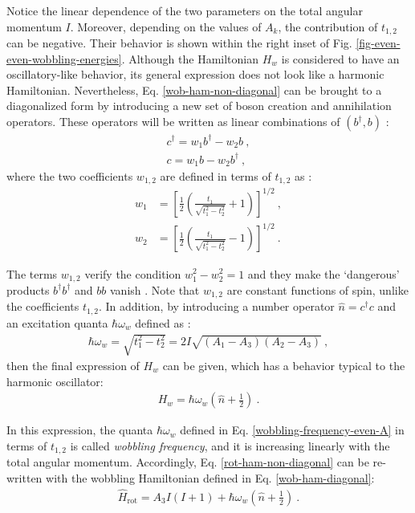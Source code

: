 Notice the linear dependence of the two parameters on the total angular momentum $I$. Moreover, depending on the values of $A_k$, the contribution of $t_{1,2}$ can be negative. Their behavior is shown within the right inset of Fig. \ref{fig-even-even-wobbling-energies}. Although the Hamiltonian $H_w$ is considered to have an oscillatory-like behavior, its general expression does not look like a harmonic Hamiltonian. Nevertheless, Eq. \ref{wob-ham-non-diagonal} can be brought to a diagonalized form by introducing a new set of boson creation and annihilation operators. These operators will be written as linear combinations of $(b^\dagger,b)$ \cite{bohr1998nuclear}:
\begin{align}
    c^\dagger=w_1b^\dagger-w_2b\ ,\\
    c=w_1b-w_2b^\dagger\ ,
\end{align}
where the two coefficients $w_{1,2}$ are defined in terms of $t_{1,2}$ as \cite{bohr1998nuclear}:
\begin{align}
    w_1&=\left[\frac{1}{2}\left(\frac{t_1}{\sqrt{t_1^2-t_2^2}}+1\right)\right]^{1/2}\ ,\nonumber\\
    w_2&=\left[\frac{1}{2}\left(\frac{t_1}{\sqrt{t_1^2-t_2^2}}-1\right)\right]^{1/2}\ .
    \label{eqs-w1-w2-terms-wobbling}
\end{align}

The terms $w_{1,2}$ verify the condition $w_1^2-w_2^2=1$ and they make the `dangerous' products $b^\dagger b^\dagger$ and $bb$ vanish \cite{oi2006semi}. Note that $w_{1,2}$ are constant functions of spin, unlike the coefficients $t_{1,2}$. In addition, by introducing a number operator $\hat{n}=c^\dagger c$ and an excitation quanta $\hbar\omega_w$ defined as \cite{bohr1998nuclear}:
\begin{align}
    \hbar\omega_w=\sqrt{t_1^2-t_2^2}=2I\sqrt{(A_1-A_3)(A_2-A_3)}\ ,
    \label{wobbling-frequency-even-A}
\end{align}
then the final expression of $H_w$ can be given, which has a behavior typical to the harmonic oscillator:
\begin{align}
    H_w=\hbar\omega_w\left(\hat{n}+\frac{1}{2}\right)\ .
    \label{wob-ham-diagonal}
\end{align}

In this expression, the quanta $\hbar\omega_w$ defined in Eq. \ref{wobbling-frequency-even-A} in terms of $t_{1,2}$ is called \emph{wobbling frequency}, and it is increasing linearly with the total angular momentum. Accordingly, Eq. \ref{rot-ham-non-diagonal} can be re-written with the wobbling Hamiltonian defined in Eq. \ref{wob-ham-diagonal}:
\begin{align}
    \hat{H}_\text{rot}=A_3I(I+1)+\hbar\omega_w\left(\hat{n}+\frac{1}{2}\right)\ .
    \label{rot-wob-ham-diagonal}
\end{align}

